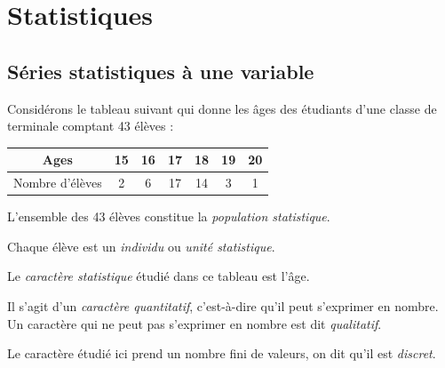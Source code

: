 
\TCDLessonStyleOn
\chapter{Statistiques}
      \section{S\'eries statistiques \`a une variable}
            \begin{defi}
                  Consid\'erons le tableau suivant qui donne les \^ages des \'etudiants d'une classe
                  de terminale comptant 43 \'el\`eves : \newline
                  \begin{tabular}{|c|c|c|c|c|c|c|}
                        \hline
                        Ages                   & 15 & 16 & 17 & 18 & 19 & 20 \\
                        \hline
                        Nombre d'\'el\`eves    &  2 &  6 & 17 & 14 &  3 &  1 \\
                        \hline
                  \end{tabular}
                  \begin{description}
                        \item L'ensemble des 43 \'el\`eves constitue la \emph{population statistique}.
                        \item Chaque \'el\`eve est un \emph{individu} ou \emph{unit\'e statistique}.
                        \item Le \emph{caract\`ere statistique} \'etudi\'e dans ce tableau est l'\^age.
                        \item Il s'agit d'un \emph{caract\`ere quantitatif}, c'est-\`a-dire qu'il peut s'exprimer en nombre.
                              Un caract\`ere qui ne peut pas s'exprimer en nombre est dit \emph{qualitatif}.
                        \item Le caract\`ere \'etudi\'e ici prend un nombre fini de valeurs, on dit qu'il est \emph{discret}.

\end{description}
\end{defi}
